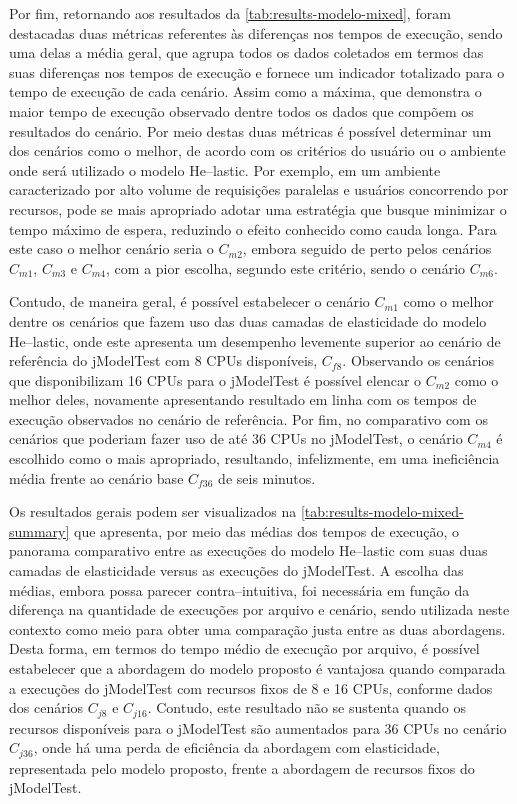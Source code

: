\documentclass[english,brazilian]{UNISINOSmonografia} %
\begin{document}
Por fim, retornando aos resultados da \autoref{tab:results-modelo-mixed}, foram destacadas duas métricas referentes às diferenças nos tempos de execução, sendo uma delas a média geral, que agrupa todos os dados coletados em termos das suas diferenças nos tempos de execução e fornece um indicador totalizado para o tempo de execução de cada cenário.
Assim como a máxima, que demonstra o maior tempo de execução observado dentre todos os dados que compõem os resultados do cenário.
%
Por meio destas duas métricas é possível determinar um dos cenários como o melhor, de acordo com os critérios do usuário ou o ambiente onde será utilizado o modelo \textsf{He}--lastic.
%
Por exemplo, em um ambiente caracterizado por alto volume de requisições paralelas e usuários concorrendo por recursos, pode se mais apropriado adotar uma estratégia que busque minimizar o tempo máximo de espera, reduzindo o efeito conhecido como cauda longa.
%
Para este caso o melhor cenário seria o $C_{m2}$, embora seguido de perto pelos cenários $C_{m1}$, $C_{m3}$ e $C_{m4}$, com a pior escolha, segundo este critério, sendo o cenário $C_{m6}$.




Contudo, de maneira geral, é possível estabelecer o cenário $C_{m1}$ como o melhor dentre os cenários que fazem uso das duas camadas de elasticidade do modelo \textsf{He}--lastic, onde este apresenta um desempenho levemente superior ao cenário de referência do jModelTest com 8 CPUs disponíveis, $C_{f8}$.
%
Observando os cenários que disponibilizam 16 CPUs para o jModelTest é possível elencar o $C_{m2}$ como o melhor deles, novamente apresentando resultado em linha com os tempos de execução observados no cenário de referência.
%
Por fim, no comparativo com os cenários que poderiam fazer uso de até 36 CPUs no jModelTest, o cenário $C_{m4}$ é escolhido como o mais apropriado, resultando, infelizmente, em uma ineficiência média frente ao cenário base $C_{f36}$ de seis minutos.



Os resultados gerais podem ser visualizados na \autoref{tab:results-modelo-mixed-summary} que apresenta, por meio das médias dos tempos de execução, o panorama comparativo entre as execuções do modelo \textsf{He}--lastic com suas duas camadas de elasticidade versus as execuções do jModelTest.
%
A escolha das médias, embora possa parecer contra--intuitiva, foi necessária em função da diferença na quantidade de execuções por arquivo e cenário, sendo utilizada neste contexto como meio para obter uma comparação justa entre as duas abordagens.
%
Desta forma, em termos do tempo médio de execução por arquivo, é possível estabelecer que a abordagem do modelo proposto é vantajosa quando comparada a execuções do jModelTest com recursos fixos de 8 e 16 CPUs, conforme dados dos cenários $C_{j8}$ e $C_{j16}$.
%
Contudo, este resultado não se sustenta quando os recursos disponíveis para o jModelTest são aumentados para 36 CPUs no cenário $C_{j36}$, onde há uma perda de eficiência da abordagem com elasticidade, representada pelo modelo proposto, frente a abordagem de recursos fixos do jModelTest.
\end{document}
